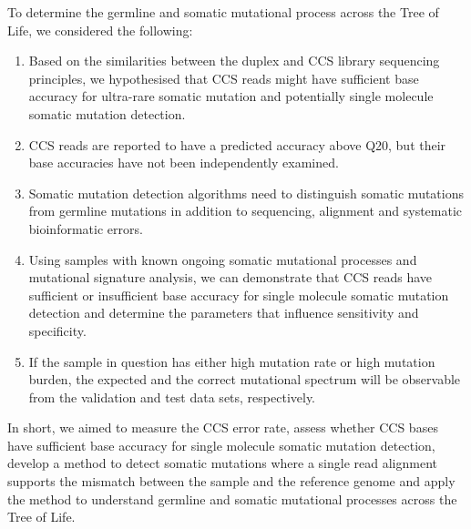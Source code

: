 To determine the germline and somatic mutational process across the Tree of Life, we considered the following:

\begin{enumerate}
\item Based on the similarities between the duplex\cite{Schmitt2012-yr} and CCS library sequencing \cite{Travers2010-sx} principles, we hypothesised that CCS reads might have sufficient base accuracy for ultra-rare somatic mutation and potentially single molecule somatic mutation detection.
\item CCS reads are reported to have a predicted accuracy above Q20, but their base accuracies have not been independently examined. 
\item Somatic mutation detection algorithms need to distinguish somatic mutations from germline mutations in addition to sequencing, alignment and systematic bioinformatic errors.
\item Using samples with known ongoing somatic mutational processes and mutational signature analysis, we can demonstrate that CCS reads have sufficient or insufficient base accuracy for single molecule somatic mutation detection and determine the parameters that influence sensitivity and specificity.
\item If the sample in question has either high mutation rate or high mutation burden, the expected and the correct mutational spectrum will be observable from the validation and test data sets, respectively. 
\end{enumerate} 

In short, we aimed to measure the CCS error rate, assess whether CCS bases have sufficient base accuracy for single molecule somatic mutation detection, develop a method to detect somatic mutations where a single read alignment supports the mismatch between the sample and the reference genome and apply the method to understand germline and somatic mutational processes across the Tree of Life. 





